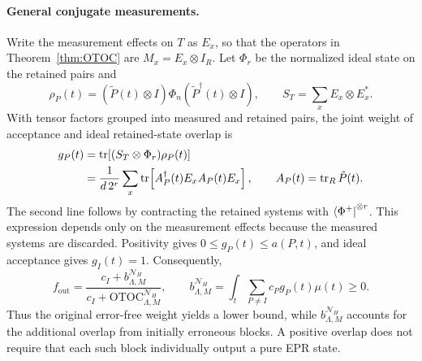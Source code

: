 \documentclass[onecolumn,prx,longbibliography,nofootinbib, superscriptaddress]{revtex4-2}
\theoremstyle{recap}
\begin{document}
\paragraph{General conjugate measurements.}
Write the measurement effects on $T$ as $E_x$, so that the operators in Theorem~\ref{thm:OTOC} are $M_x=E_x\otimes I_R$. Let $\Phi_r$ be the normalized ideal state on the retained pairs and
\begin{equation}
    \rho_P(t)=(\tilde P(t)\otimes I)\Phi_n(\tilde P^{\dagger}(t)\otimes I),\qquad
    S_T=\sum_x E_x\otimes E_x^*.
\end{equation}
With tensor factors grouped into measured and retained pairs, the joint weight of acceptance and ideal retained-state overlap is
\begin{equation}\label{eq:general_good_weight}
\begin{split}
    g_P(t)&=\tr\!\left[(S_T\otimes\Phi_r)\rho_P(t)\right]\\
    &=\frac{1}{d\,2^r}\sum_x\tr\!\left[A_P^{\dagger}(t)E_x A_P(t)E_x\right],\qquad
      A_P(t)=\tr_R\tilde P(t).
\end{split}
\end{equation}
The second line follows by contracting the retained systems with $\bra{\Phi^+}^{\otimes r}$. This expression depends only on the measurement effects because the measured systems are discarded. Positivity gives $0\leq g_P(t)\leq a(P,t)$, and ideal acceptance gives $g_I(t)=1$. Consequently,
\begin{equation}\label{eq:exact_general_fidelity}
    f_{\mathrm{out}}=
    \frac{c_I+b_{\Lambda,M}^{\mathcal N_H}}{c_I+\mathrm{OTOC}_{\Lambda,M}^{\mathcal N_H}},\qquad
    b_{\Lambda,M}^{\mathcal N_H}=\int_t\sum_{P\neq I}c_Pg_P(t)\mu(t)\geq0.
\end{equation}
Thus the original error-free weight yields a lower bound, while $b_{\Lambda,M}^{\mathcal N_H}$ accounts for the additional overlap from initially erroneous blocks. A positive overlap does not require that each such block individually output a pure EPR state.
\end{document}
